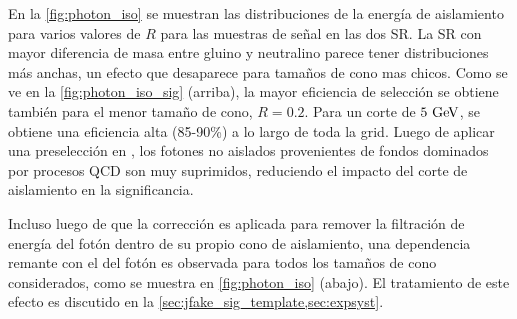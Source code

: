 En la \cref{fig:photon_iso} se muestran las distribuciones de la energía de
aislamiento para varios valores de $R$ para las muestras de señal en las dos SR.
La SR con mayor diferencia de masa entre gluino y neutralino parece tener
distribuciones más anchas, un efecto que desaparece para tamaños de cono mas
chicos. Como se ve en la \cref{fig:photon_iso_sig} (arriba), la mayor eficiencia
de selección se obtiene también para el menor tamaño de cono, $R = 0.2$. Para un
corte de $5 \GeV$, se obtiene una eficiencia alta (85-90\%) a lo largo de toda la
grid. Luego de aplicar una preselección en {\met}, los fotones no aislados
provenientes de fondos dominados por procesos QCD son muy suprimidos, reduciendo el impacto
del corte de aislamiento en la significancia.

Incluso luego de que la corrección es aplicada para remover la filtración de
energía del fotón dentro de su propio cono de aislamiento, una dependencia remante
con el {\pt} del fotón es observada para todos los tamaños de cono
considerados, como se muestra en \cref{fig:photon_iso} (abajo). El tratamiento
de este efecto es discutido en la \cref{sec:jfake_sig_template,sec:expsyst}.


